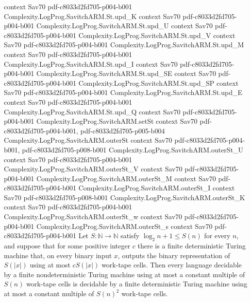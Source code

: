 \begin{theorem}
  {context}
  {Sav70}
  {pdf-c8033d2fd705-p004-b001}
\proofstep
  {Complexity.LogProg.SavitchARM.St.upd_K}
  {context}
  {Sav70}
  {pdf-c8033d2fd705-p004-b001}
\proofstep
  {Complexity.LogProg.SavitchARM.St.upd_U}
  {context}
  {Sav70}
  {pdf-c8033d2fd705-p004-b001}
\proofstep
  {Complexity.LogProg.SavitchARM.St.upd_V}
  {context}
  {Sav70}
  {pdf-c8033d2fd705-p004-b001}
\proofstep
  {Complexity.LogProg.SavitchARM.St.upd_M}
  {context}
  {Sav70}
  {pdf-c8033d2fd705-p004-b001}
\proofstep
  {Complexity.LogProg.SavitchARM.St.upd_I}
  {context}
  {Sav70}
  {pdf-c8033d2fd705-p004-b001}
\proofstep
  {Complexity.LogProg.SavitchARM.St.upd_SE}
  {context}
  {Sav70}
  {pdf-c8033d2fd705-p004-b001}
\proofstep
  {Complexity.LogProg.SavitchARM.St.upd_SP}
  {context}
  {Sav70}
  {pdf-c8033d2fd705-p004-b001}
\proofstep
  {Complexity.LogProg.SavitchARM.St.upd_E}
  {context}
  {Sav70}
  {pdf-c8033d2fd705-p004-b001}
\proofstep
  {Complexity.LogProg.SavitchARM.St.upd_Q}
  {context}
  {Sav70}
  {pdf-c8033d2fd705-p004-b001}
\proofstep
  {Complexity.LogProg.SavitchARM.setSt}
  {context}
  {Sav70}
  {pdf-c8033d2fd705-p004-b001,
    pdf-c8033d2fd705-p005-b004}
\proofstep
  {Complexity.LogProg.SavitchARM.outerSt}
  {context}
  {Sav70}
  {pdf-c8033d2fd705-p004-b001,
    pdf-c8033d2fd705-p008-b001}
\proofstep
  {Complexity.LogProg.SavitchARM.outerSt_U}
  {context}
  {Sav70}
  {pdf-c8033d2fd705-p004-b001}
\proofstep
  {Complexity.LogProg.SavitchARM.outerSt_V}
  {context}
  {Sav70}
  {pdf-c8033d2fd705-p004-b001}
\proofstep
  {Complexity.LogProg.SavitchARM.outerSt_M}
  {context}
  {Sav70}
  {pdf-c8033d2fd705-p004-b001}
\proofstep
  {Complexity.LogProg.SavitchARM.outerSt_I}
  {context}
  {Sav70}
  {pdf-c8033d2fd705-p008-b001}
\proofstep
  {Complexity.LogProg.SavitchARM.outerSt_K}
  {context}
  {Sav70}
  {pdf-c8033d2fd705-p004-b001}
\proofstep
  {Complexity.LogProg.SavitchARM.outerSt_w}
  {context}
  {Sav70}
  {pdf-c8033d2fd705-p004-b001}
\proofstep
  {Complexity.LogProg.SavitchARM.outerSt_s}
  {context}
  {Sav70}
  {pdf-c8033d2fd705-p004-b001}
Let $S\colon\mathbb{N}\to\mathbb{N}$ satisfy $\log_2 n+1\le S(n)$ for every $n$, and
suppose that for some positive integer $c$ there is a finite deterministic Turing
machine that, on every binary input $x$, outputs the binary representation of $S(|x|)$
using at most $cS(|x|)$ work-tape cells. Then every language decidable by a finite
nondeterministic Turing machine using at most a constant multiple of $S(n)$ work-tape
cells is decidable by a finite deterministic Turing machine using at most a constant
multiple of $S(n)^2$ work-tape cells.
\end{theorem}

